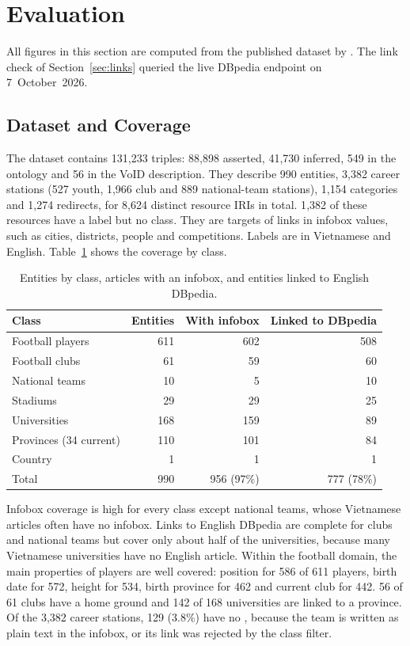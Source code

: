 \section{Evaluation}
\label{sec:evaluation}

All figures in this section are computed from the published dataset by
. The link check of
Section~\ref{sec:links} queried the live DBpedia endpoint on 7~October~2026.

\subsection{Dataset and Coverage}
\label{sec:stats}

The dataset contains 131{,}233 triples: 88{,}898 asserted, 41{,}730 inferred,
549 in the ontology and 56 in the VoID description. They describe 990
entities, 3{,}382 career stations (527 youth, 1{,}966 club and 889
national-team stations), 1{,}154 categories and 1{,}274 redirects, for 8{,}624
distinct resource IRIs in total. 1{,}382 of these resources have a label but
no class. They are targets of links in infobox values, such as cities,
districts, people and competitions. Labels are in Vietnamese and English. Table~\ref{tab:coverage}
shows the coverage by class.

\begin{table}[t]
\centering
\caption{Entities by class, articles with an infobox, and entities linked to
English DBpedia.}
\label{tab:coverage}
\small
\begin{tabular}{@{}lrrr@{}}
\toprule
Class & Entities & With infobox & Linked to DBpedia \\
\midrule
Football players       & 611 & 602 & 508 \\
Football clubs         & 61  & 59  & 60 \\
National teams         & 10  & 5   & 10 \\
Stadiums               & 29  & 29  & 25 \\
Universities           & 168 & 159 & 89 \\
Provinces (34 current) & 110 & 101 & 84 \\
Country                & 1   & 1   & 1 \\
\midrule
Total                  & 990 & 956 (97\%) & 777 (78\%) \\
\bottomrule
\end{tabular}
\end{table}

Infobox coverage is high for every class except national teams, whose
Vietnamese articles often have no infobox. Links to English DBpedia are
complete for clubs and national teams but cover only about half of the
universities, because many Vietnamese universities have no English article.
Within the football domain, the main properties of players are well
covered: position for 586 of 611 players, birth date for 572, height for 534,
birth province for 462 and current club for 442. 56 of 61 clubs have a home
ground and 142 of 168 universities are linked to a province. Of the 3{,}382
career stations, 129 (3.8\%) have no , because the team is
written as plain text in the infobox, or its link was rejected by the class
filter.

